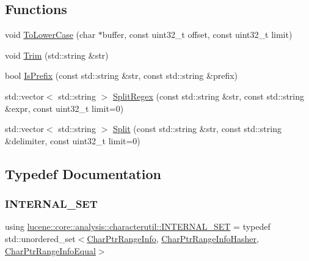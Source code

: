 \subsection*{Functions}
\begin{DoxyCompactItemize}
\item 
void \mbox{\hyperlink{namespacelucene_1_1core_1_1analysis_1_1characterutil_a8970bd9664a398220515d53e97cb051c}{To\+Lower\+Case}} (char $\ast$buffer, const uint32\+\_\+t offset, const uint32\+\_\+t limit)
\item 
void \mbox{\hyperlink{namespacelucene_1_1core_1_1analysis_1_1characterutil_a8deb75debf79b7151ec2fed2b932bdde}{Trim}} (std\+::string \&str)
\item 
bool \mbox{\hyperlink{namespacelucene_1_1core_1_1analysis_1_1characterutil_a95456ad6dbf1995507914b6b32fca8df}{Is\+Prefix}} (const std\+::string \&str, const std\+::string \&prefix)
\item 
std\+::vector$<$ std\+::string $>$ \mbox{\hyperlink{namespacelucene_1_1core_1_1analysis_1_1characterutil_ab8a8fe2b305fad128673af6acf6ed291}{Split\+Regex}} (const std\+::string \&str, const std\+::string \&expr, const uint32\+\_\+t limit=0)
\item 
std\+::vector$<$ std\+::string $>$ \mbox{\hyperlink{namespacelucene_1_1core_1_1analysis_1_1characterutil_a9f1e4e8422bdc82acbdd2170e3123271}{Split}} (const std\+::string \&str, const std\+::string \&delimiter, const uint32\+\_\+t limit=0)
\end{DoxyCompactItemize}


\subsection{Typedef Documentation}
\mbox{\label{namespacelucene_1_1core_1_1analysis_1_1characterutil_a2b64bd3cca4a8e9112fcbfaebc68aeee}} 
\subsubsection{\texorpdfstring{I\+N\+T\+E\+R\+N\+A\+L\+\_\+\+S\+ET}{INTERNAL\_SET}}
{\footnotesize\ttfamily using \mbox{\hyperlink{namespacelucene_1_1core_1_1analysis_1_1characterutil_a2b64bd3cca4a8e9112fcbfaebc68aeee}{lucene\+::core\+::analysis\+::characterutil\+::\+I\+N\+T\+E\+R\+N\+A\+L\+\_\+\+S\+ET}} = typedef std\+::unordered\+\_\+set$<$\mbox{\hyperlink{classlucene_1_1core_1_1analysis_1_1characterutil_1_1CharPtrRangeInfo}{Char\+Ptr\+Range\+Info}}, \mbox{\hyperlink{classlucene_1_1core_1_1analysis_1_1characterutil_1_1CharPtrRangeInfoHasher}{Char\+Ptr\+Range\+Info\+Hasher}}, \mbox{\hyperlink{classlucene_1_1core_1_1analysis_1_1characterutil_1_1CharPtrRangeInfoEqual}{Char\+Ptr\+Range\+Info\+Equal}}$>$}



